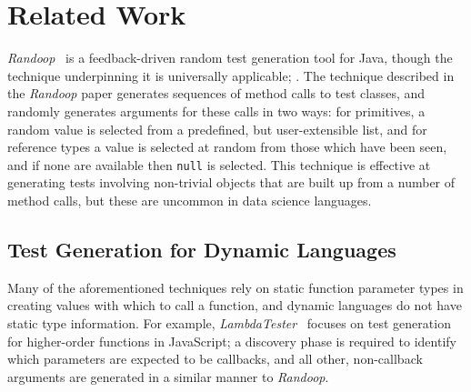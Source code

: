 \section{Related Work}


\emph{Randoop}~\cite{pacheco2007randoop} is a feedback-driven random test generation tool for Java, though the technique underpinning it is universally applicable; .
The technique described in the \emph{Randoop} paper generates sequences of method calls to test classes, and randomly generates arguments for these calls in two ways: for primitives, a random value is selected from a predefined, but user-extensible list, and for reference types a value is selected at random from those which have been seen, and if none are available then {\tt null} is selected.
This technique is effective at generating tests involving non-trivial objects that are built up from a number of method calls, but these are uncommon in data science languages.


\subsection{Test Generation for Dynamic Languages}

Many of the aforementioned techniques rely on static function parameter types in creating values with which to call a function, and dynamic languages do not have static type information.
For example, \emph{LambdaTester}~\cite{lambdatester} focuses on test generation for higher-order functions in JavaScript; a discovery phase is required to identify which parameters are expected to be callbacks, and all other, non-callback arguments are generated in a similar manner to \emph{Randoop}.

